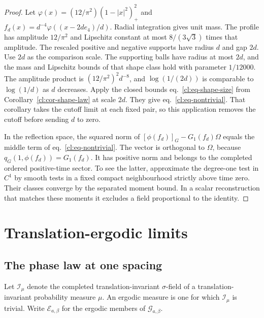 \documentclass[11pt,letterpaper,reqno]{amsart}
\numberwithin{equation}{section}
\renewcommand{\eqref}[1]{\textup{eq.~\ref{#1}}}
\theoremstyle{definition}
\theoremstyle{remark}
\begin{document}
\begin{proof}
Let
\(\varphi(x)=(12/\pi^2)(1-|x|^2)_+^2\) and
\(f_d(x)=d^{-4}\varphi((x-2de_4)/d)\).
Radial integration gives unit mass. The profile has
amplitude \(12/\pi^2\) and Lipschitz constant at most
\(8/(3\sqrt3)\) times that amplitude. The rescaled
positive and negative supports have radius \(d\) and
gap \(2d\). Use \(2d\) as the comparison scale. The supporting
balls have radius at most \(2d\), and the mass and Lipschitz
bounds of that shape class hold with parameter \(1/12000\).
The amplitude product is \((12/\pi^2)^2d^{-8}\), and
\(\log(1/(2d))\) is comparable to \(\log(1/d)\) as \(d\)
decreases. Apply the closed bounds
\eqref{cl:eq-shape-size} from Corollary~\ref{cl:cor-shape-law}
at scale \(2d\). They give \eqref{cl:eq-nontrivial}.
That corollary takes the cutoff limit at each fixed pair,
so this application removes the cutoff before sending \(d\) to zero.

In the reflection space, the squared norm of
\([\phi(f_d)]_G-G_1(f_d)\Omega\) equals the middle term of
\eqref{cl:eq-nontrivial}. The vector is orthogonal to
\(\Omega\), because \(q_G(1,\phi(f_d))=G_1(f_d)\).
It has positive norm and belongs to the completed ordered
positive-time sector. To see the latter, approximate the
degree-one test in \(C^1\) by smooth tests in a fixed
compact neighbourhood strictly above time zero. Their
classes converge by the separated moment bound. In a scalar
reconstruction that matches these moments it excludes a field proportional
to the identity.
\end{proof}


\section{Translation-ergodic limits}
\label{cl:sec-phases}

\subsection{The phase law at one spacing}

Let \(\mathcal I_\mu\) denote the completed translation-invariant
\(\sigma\)-field of a translation-invariant probability measure
\(\mu\). An ergodic measure is one for which \(\mathcal I_\mu\)
is trivial. Write \(\mathcal E_{a,\beta}\) for the ergodic
members of \(\mathcal G_{a,\beta}\).
\end{document}

